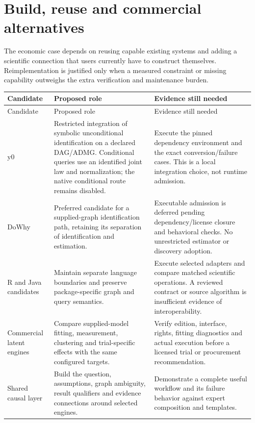 \hypertarget{build-reuse-and-commercial-alternatives}{%
\section{Build, reuse and commercial
alternatives}\label{build-reuse-and-commercial-alternatives}}

The economic case depends on reusing capable existing systems and adding
a scientific connection that users currently have to construct
themselves. Reimplementation is justified only when a measured
constraint or missing capability outweighs the extra verification and
maintenance burden.

\begin{longtable}{@{}p{.19\linewidth}p{.37\linewidth}p{.36\linewidth}@{}}
\toprule
Candidate & Proposed role & Evidence still needed \\
\midrule
\endfirsthead
\toprule
Candidate & Proposed role & Evidence still needed \\
\midrule
\endhead
y0 & Restricted integration of symbolic unconditional identification on a declared DAG/ADMG. Conditional queries use an identified joint law and normalization; the native conditional route remains disabled. & Execute the pinned dependency environment and the exact conversion/failure cases. This is a local integration choice, not runtime admission. \\
DoWhy & Preferred candidate for a supplied-graph identification path, retaining its separation of identification and estimation. & Executable admission is deferred pending dependency/license closure and behavioral checks. No unrestricted estimator or discovery adoption. \\
R and Java candidates & Maintain separate language boundaries and preserve package-specific graph and query semantics. & Execute selected adapters and compare matched scientific operations. A reviewed contract or source algorithm is insufficient evidence of interoperability. \\
Commercial latent engines & Compare supplied-model fitting, measurement, clustering and trial-specific effects with the same configured targets. & Verify edition, interface, rights, fitting diagnostics and actual execution before a licensed trial or procurement recommendation. \\
Shared causal layer & Build the question, assumptions, graph ambiguity, result qualifiers and evidence connections around selected engines. & Demonstrate a complete useful workflow and its failure behavior against expert composition and templates. \\
\bottomrule
\end{longtable}

